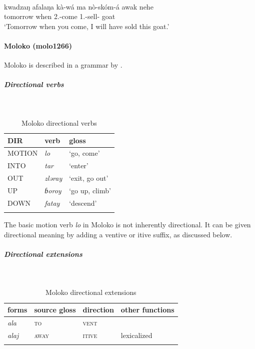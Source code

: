 \ea\label{ex2:mada5}
 \\
\gll kwadzaŋ afalaŋa kà-wá ma nò-skóm-á awak nehe \\
tomorrow when 2.-come  1.-sell- goat  \\
\glt `Tomorrow when you come, I will have sold this goat.'
\z 

\paragraph*{Moloko (molo1266)} \label{molo}

Moloko is described in a grammar by \citet{friesenGrammarMoloko2017}. 

\subparagraph{Directional verbs}~

\begin{table}[H]
	\caption{Moloko directional verbs} 
	\label{tab:moloV}
	\begin{tabular}{lll} %
		\lsptoprule
		DIR & verb & gloss   \\ %
		\midrule
		MOTION & \textit{lo} & `go, come' \\
		INTO& \textit{tar} & `enter' \\
		OUT & \textit{zləray} & `exit, go out' \\
		UP & \textit{ɓoroy} & `go up, climb' \\
		DOWN & \textit{fatay} & `descend' \\
		\lspbottomrule
	\end{tabular}
\end{table}

\largerpage[2]
The basic motion verb \textit{lo} in Moloko is not inherently directional. It can be given directional meaning by adding a ventive or itive suffix, as discussed below. 

\subparagraph{Directional extensions}~

\begin{table}[H]
	\caption{Moloko directional extensions}
	\label{tab:molo}
	\begin{tabular}{llll} %
		\lsptoprule
		forms & source gloss & direction  & other functions  \\ %
		\midrule
		\textit{ala}  &  \textsc{to}  &   \textsc{vent} &     \\
		\textit{alaj}  &  \textsc{away}  & \textsc{itive}  &  lexicalized  \\
		\lspbottomrule
	\end{tabular}
\end{table} 

